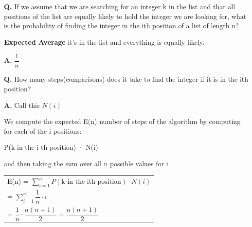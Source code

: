 \documentclass{article}
\begin{document}
\vspace{0.3cm}

\textbf{Q.} If we assume that we are searching for an integer k in the list and that all positions of the list are equally likely to hold the integer we are looking for, what is the probability of finding the integer in the ith position of a list of length n?

\textbf{Expected Average} it's in the list and everything is equally likely.

\textbf{A.} $\dfrac{1}{n}$

\vspace{0.3cm}

\textbf{Q.} How many steps(comparisons) does it take to find the integer if it is in the
ith position?

\textbf{A.} Call this $N(i)$

We compute the expected E(n) number of steps of the algorithm
by computing for each of the i positions:

\centerline{P(k in the i
th position) · N(i)}

and then taking the sum over all n possible values for i

\begin{tabular}{l}
  E(n) = $\displaystyle \sum_{i = 1}^{n} P(\text{k in the ith position}) \cdot N(i)$\\
= $\displaystyle \sum_{i = 1}^{n} \dfrac{1}{n} \cdot i$\\
= $\displaystyle \dfrac{1}{n} \cdot \dfrac{n(n+1)}{2} = \dfrac{n(n + 1)}{2}$
\end{tabular}
\end{document}
